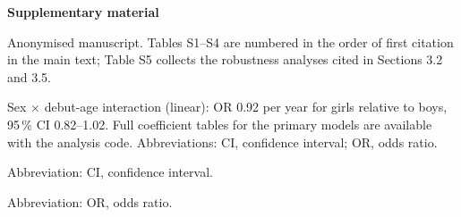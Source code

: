\documentclass[12pt,a4paper]{article}
\begin{document}
\noindent\textbf{Supplementary material}

\bigskip
{}

\medskip
\noindent Anonymised manuscript. Tables S1--S4 are numbered in the order of first citation in the main text; Table S5 collects the robustness analyses cited in Sections 3.2 and 3.5.


\begin{table}[H]
\centering
\caption*{\textbf{Table S1.} Sample flow.}
\small

\end{table}

\begin{table}[H]
\centering
\caption*{\textbf{Table S2.} Senior conversion by debut age and sex (born 2001--2005), \% (Wilson 95\,\% CI).}
\small

\vspace{0.2em}
\parbox{0.8\textwidth}{\footnotesize Sex $\times$ debut-age interaction (linear): OR 0.92 per year for girls relative to boys, 95\,\% CI 0.82--1.02. Full coefficient tables for the primary models are available with the analysis code. Abbreviations: CI, confidence interval; OR, odds ratio.}
\end{table}

\begin{table}[H]
\centering
\caption*{\textbf{Table S3.} Retention $k$ years after the debut season: proportion (Wilson 95\,\% CI). Denominators equal the debut-age n except debut 16 at $k$ = 5 (n = 389).}
\scriptsize

\vspace{0.2em}
\parbox{0.8\textwidth}{\footnotesize Abbreviation: CI, confidence interval.}
\end{table}

\begin{table}[H]
\centering
\caption*{\textbf{Table S4.} Competing at equal career length: proportion with at least two competition days in a single season at least 4, 5 and 6 years after the debut season, by debut age (n = athletes for whom that season was fully observable by 2025), with the adjusted OR per year of later debut (sex, birth cohort, club size).}
\small

\vspace{0.2em}
\parbox{0.8\textwidth}{\footnotesize Abbreviation: OR, odds ratio.}
\end{table}


\begin{table}[H]
\centering
\caption*{\textbf{Table S5.} Robustness analyses. Estimates are for debut age (per +1 year, linear) unless stated; outcome is senior activity unless stated. Abbreviations: CI, confidence interval; COVID-19, coronavirus disease 2019; OR, odds ratio; SE, standard error.}
\small

\end{table}
\end{document}
